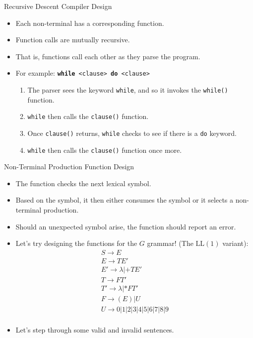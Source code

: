 \documentclass[]{beamer}
\begin{document}
\begin{frame}{Recursive Descent Compiler Design}
    \begin{itemize}[<+->]
        \item Each non-terminal has a corresponding function.
        \item Function calls are mutually recursive.  
        \item That is, functions call each other as they parse the
            program.
        \item For example: \texttt{\textbf{while} <clause> \textbf{do} <clause>}
        \begin{enumerate}
            \item The parser sees the keyword \texttt{while}, and so
                it invokes the \texttt{while()} function.
            \item \texttt{while} then calls the \texttt{clause()} function.
            \item Once \texttt{clause()} returns, \texttt{while}
                checks to see if there is a \texttt{do} keyword.
            \item \texttt{while} then calls the \texttt{clause()}
                function once more.
        \end{enumerate}
    \end{itemize}
\end{frame}

\begin{frame}{Non-Terminal Production Function Design}
    \begin{itemize}[<+->]
        \item The function checks the next lexical symbol. 
        \item Based on the symbol, it then either consumes the symbol
            or it selects a non-terminal production.
        \item Should an unexpected symbol arise, the function should
            report an error.
        \item Let's try designing the functions for the $G$ grammar! (The
        $\mathrm{LL}(1)$ variant):
        \[
        \begin{array}{l}
            S \rightarrow E \\
            E \rightarrow TE'\\
            E' \rightarrow \lambda | + T E' \\
            T \rightarrow FT'\\
            T' \rightarrow \lambda | *FT'\\
            F \rightarrow (E) | U\\
            U \rightarrow 0|1|2|3|4|5|6|7|8|9\\
        \end{array}
        \]
        \item Let's step through some valid and invalid sentences.
    \end{itemize}
\end{frame}
\end{document}
